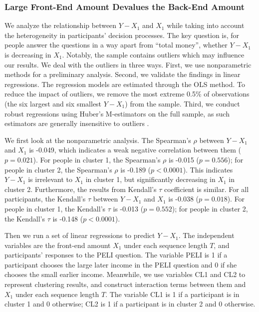 \documentclass[
  12pt,
]{article}
\begin{document}
\hypertarget{large-front-end-amount-devalues-the-back-end-amount}{%
\subsubsection{Large Front-End Amount Devalues the Back-End
Amount}\label{large-front-end-amount-devalues-the-back-end-amount}}

We analyze the relationship between \(Y - X_1\) and \(X_1\) while taking
into account the heterogeneity in participants' decision processes. The
key question is, for people answer the questions in a way apart from
``total money'', whether \(Y-X_1\) is decreasing in \(X_1\). Notably,
the sample contains outliers which may influence our results. We deal
with the outliers in three ways. First, we use nonparametric methods for
a preliminary analysis. Second, we validate the findings in linear
regressions. The regression models are estimated through the OLS method.
To reduce the impact of outliers, we remove the most extreme 0.5\% of
observations (the six largest and six smallest \(Y-X_1\)) from the
sample. Third, we conduct robust regressions using Huber's M-estimators
on the full sample, as such estimators are generally insensitive to
outliers \citep{huber2009robust}.

We first look at the nonparametric analysis. The Spearman's \(\rho\)
between \(Y - X_1\) and \(X_1\) is -0.049, which indicates a weak
negative correlation between them (\(p=0.021\)). For people in cluster
1, the Spearman's \(\rho\) is -0.015 (\(p=0.556\)); for people in
cluster 2, the Spearman's \(\rho\) is -0.189 (\(p<0.0001\)). This
indicates \(Y-X_1\) is irrelevant to \(X_1\) in cluster 1, but
significantly decreasing in \(X_1\) in cluster 2. Furthermore, the
results from Kendall's \(\tau\) coefficient is similar. For all
participants, the Kendall's \(\tau\) between \(Y-X_1\) and \(X_1\) is
-0.038 (\(p=0.018\)). For people in cluster 1, the Kendall's \(\tau\) is
-0.013 (\(p=0.552\)); for people in cluster 2, the Kendall's \(\tau\) is
-0.148 (\(p<0.0001\)).

Then we run a set of linear regressions to predict \(Y- X_1\). The
independent variables are the front-end amount \(X_1\) under each
sequence length \(T\), and participants' responses to the PELI question.
The variable PELI is 1 if a participant chooses the large later income
in the PELI question and 0 if she chooses the small earlier income.
Meanwhile, we use variables CL1 and CL2 to represent clustering results,
and construct interaction terms between them and \(X_1\) under each
sequence length \(T\). The variable CL1 is 1 if a participant is in
cluster 1 and 0 otherwise; CL2 is 1 if a participant is in cluster 2 and
0 otherwise.
\end{document}
